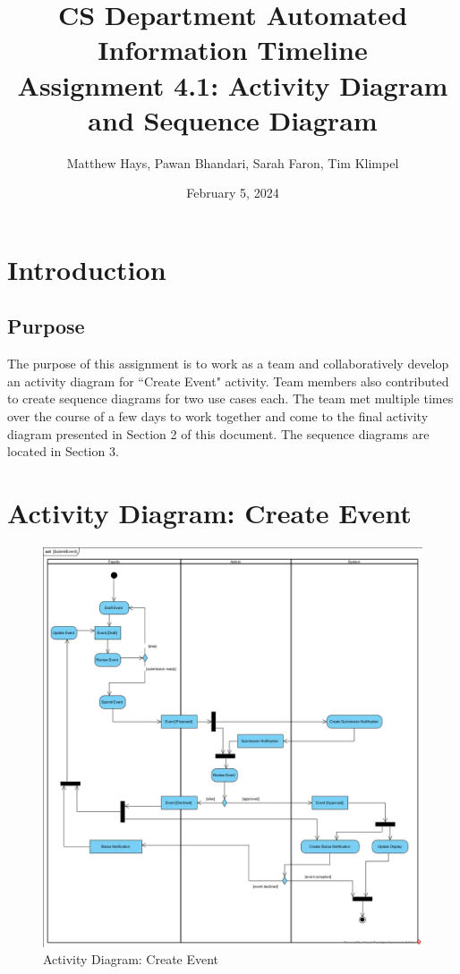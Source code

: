 \documentclass{article}
\title{CS Department Automated Information Timeline \\ Assignment 4.1: Activity Diagram and Sequence Diagram}
\date{February 5, 2024}
\author{Matthew Hays, Pawan Bhandari, Sarah Faron, Tim Klimpel}
\begin{document}
\maketitle
\newpage
\tableofcontents
\listoffigures
\newpage

\section{Introduction}
\subsection{Purpose}
The purpose of this assignment is to work as a team and collaboratively develop an activity diagram for ``Create Event" activity. Team members also contributed to create sequence diagrams for two use cases each. The team met multiple times over the course of a few days to work together and come to the final activity diagram presented in Section 2 of this document. The sequence diagrams are located in Section 3.

\section{Activity Diagram: Create Event}
\begin{figure}[H]
    \centering
    \includegraphics[width=.98\textwidth]{images/SubmitEvent.png}
    \centering
    \caption{Activity Diagram: Create Event}
    \label{fig:activityDiagram}
\end{figure}
\end{document}
